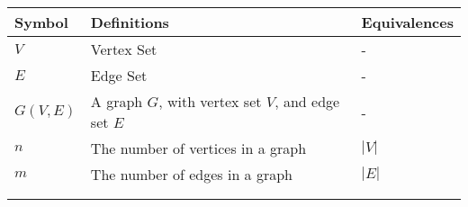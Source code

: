 \setlength{\arrayrulewidth}{0.5mm}
\setlength{\tabcolsep}{18pt}
\renewcommand{\arraystretch}{1.5}

\begin{tabular}{ |p{3cm}|p{3cm}|p{3cm}|  }
    \hline
    \textbf{Symbol} & \textbf{Definitions}                               & \textbf{Equivalences} \\
    \hline
    $V$             & Vertex Set                                         & -                     \\
    \hline
    $E$             & Edge Set                                           & -                     \\
    \hline

    $G(V, E)$       & A graph $G$, with vertex set $V$, and edge set $E$ & -                     \\
    \hline

    $n$             & The number of vertices in a graph                  & $|V|$                 \\
    \hline

    $m$             & The number of edges in a graph                     & $|E|$                 \\
    \hline

                    &                                                    &                       \\
    \hline

                    &                                                    &                       \\

    \hline
\end{tabular}